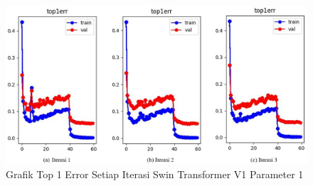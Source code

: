 \begin{figure}[ht]
  \centering
  \includegraphics[scale=0.55]{gambar/Train SwinV1 Top1Err.png}
  \caption{Grafik Top 1 Error Setiap Iterasi Swin Transformer V1 Parameter 1}
  \label{fig:grafiktop1errdariswinv1parameter1}
\end{figure}


